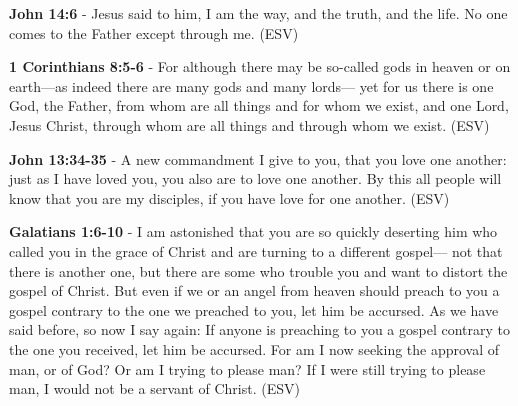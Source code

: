 \documentclass[11pt]{article}
\begin{document}
\textbf{John 14:6} -  Jesus said to him, I am the way, and the truth, and the life.  No one comes to the Father except through me.  (ESV)

\textbf{1 Corinthians 8:5-6} -  For although there may be so-called gods in heaven or on earth—as indeed there are many gods and many lords— yet for us there is one God, the Father, from whom are all things and for whom we exist, and one Lord, Jesus Christ, through whom are all things and through whom we exist.  (ESV)

\textbf{John 13:34-35} -  A new commandment I give to you, that you love one another: just as I have loved you, you also are to love one another.  By this all people will know that you are my disciples, if you have love for one another.  (ESV)

\textbf{Galatians 1:6-10} -  I am astonished that you are so quickly deserting him who called you in the grace of Christ and are turning to a different gospel— not that there is another one, but there are some who trouble you and want to distort the gospel of Christ.  But even if we or an angel from heaven should preach to you a gospel contrary to the one we preached to you, let him be accursed.  As we have said before, so now I say again: If anyone is preaching to you a gospel contrary to the one you received, let him be accursed.  For am I now seeking the approval of man, or of God?  Or am I trying to please man?  If I were still trying to please man, I would not be a servant of Christ.  (ESV)
\end{document}
